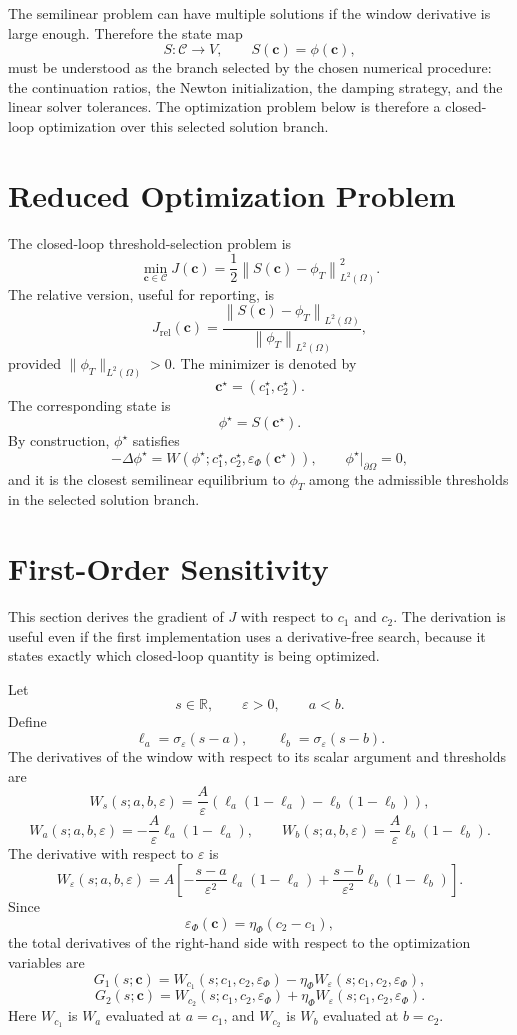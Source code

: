 \documentclass[11pt]{article}
\newcommand{\R}{\mathbb R}
\newcommand{\OmegaD}{\Omega}
\newcommand{\V}{V}
\newcommand{\sig}{\sigma}
\newcommand{\W}{W}
\newcommand{\cvec}{\bm c}
\newcommand{\phistar}{\phi^\star}
\newcommand{\phit}{\phi_T}
\newcommand{\epsp}{\varepsilon_\Phi}
\begin{document}
The semilinear problem can have multiple solutions if the window derivative is
large enough.  Therefore the state map
\[
  S:\mathcal C\to\V,
  \qquad
  S(\cvec)=\phi(\cvec),
\]
must be understood as the branch selected by the chosen numerical procedure:
the continuation ratios, the Newton initialization, the damping strategy, and
the linear solver tolerances.  The optimization problem below is therefore a
closed-loop optimization over this selected solution branch.

\section{Reduced Optimization Problem}

The closed-loop threshold-selection problem is
\[
  \boxed{
  \min_{\cvec\in\mathcal C}
  J(\cvec)
  =
  \frac{1}{2}
  \left\|S(\cvec)-\phit\right\|_{L^2(\OmegaD)}^2 .
  }
\]
The relative version, useful for reporting, is
\[
  J_{\mathrm{rel}}(\cvec)
  =
  \frac{
    \left\|S(\cvec)-\phit\right\|_{L^2(\OmegaD)}
  }{
    \left\|\phit\right\|_{L^2(\OmegaD)}
  },
\]
provided \(\|\phit\|_{L^2(\OmegaD)}>0\).  The minimizer is denoted by
\[
  \cvec^\star = (c_1^\star,c_2^\star).
\]
The corresponding state is
\[
  \phistar = S(\cvec^\star).
\]
By construction, \(\phistar\) satisfies
\[
  -\Delta\phistar
  =
  \W(\phistar;c_1^\star,c_2^\star,\epsp(\cvec^\star)),
  \qquad
  \phistar|_{\partial\OmegaD}=0,
\]
and it is the closest semilinear equilibrium to \(\phit\) among the
admissible thresholds in the selected solution branch.

\section{First-Order Sensitivity}

This section derives the gradient of \(J\) with respect to \(c_1\) and
\(c_2\).  The derivation is useful even if the first implementation uses a
derivative-free search, because it states exactly which closed-loop quantity is
being optimized.

Let
\[
  s\in\R,\qquad
  \varepsilon>0,\qquad
  a<b.
\]
Define
\[
  \ell_a = \sig_\varepsilon(s-a),
  \qquad
  \ell_b = \sig_\varepsilon(s-b).
\]
The derivatives of the window with respect to its scalar argument and
thresholds are
\[
  \W_s(s;a,b,\varepsilon)
  =
  \frac{A}{\varepsilon}
  \left(\ell_a(1-\ell_a)-\ell_b(1-\ell_b)\right),
\]
\[
  \W_a(s;a,b,\varepsilon)
  =
  -\frac{A}{\varepsilon}\ell_a(1-\ell_a),
  \qquad
  \W_b(s;a,b,\varepsilon)
  =
  \frac{A}{\varepsilon}\ell_b(1-\ell_b).
\]
The derivative with respect to \(\varepsilon\) is
\[
  \W_\varepsilon(s;a,b,\varepsilon)
  =
  A\left[
    -\frac{s-a}{\varepsilon^2}\ell_a(1-\ell_a)
    +
    \frac{s-b}{\varepsilon^2}\ell_b(1-\ell_b)
  \right].
\]
Since
\[
  \epsp(\cvec)=\eta_\Phi(c_2-c_1),
\]
the total derivatives of the right-hand side with respect to the optimization
variables are
\[
  G_1(s;\cvec)
  =
  \W_{c_1}(s;c_1,c_2,\epsp)
  -
  \eta_\Phi\W_\varepsilon(s;c_1,c_2,\epsp),
\]
\[
  G_2(s;\cvec)
  =
  \W_{c_2}(s;c_1,c_2,\epsp)
  +
  \eta_\Phi\W_\varepsilon(s;c_1,c_2,\epsp).
\]
Here \(\W_{c_1}\) is \(\W_a\) evaluated at \(a=c_1\), and
\(\W_{c_2}\) is \(\W_b\) evaluated at \(b=c_2\).
\end{document}
